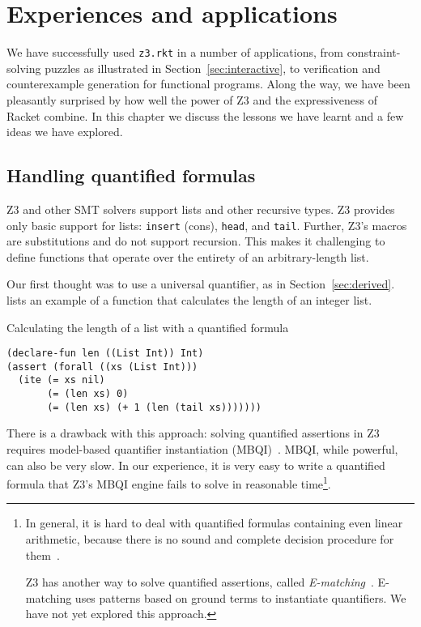 \chapter{Experiences and applications}

We have successfully used \texttt{z3.rkt} in a number of applications, from
constraint-solving puzzles as illustrated in Section~\ref{sec:interactive}, to
verification and counterexample generation for functional programs. Along the
way, we have been pleasantly surprised by how well the power of Z3 and the
expressiveness of Racket combine. In this chapter we discuss the lessons we
have learnt and a few ideas we have explored.

\section{Handling quantified formulas}
\label{sec:quantified}

Z3 and other SMT solvers support lists and other recursive types. Z3 provides
only basic support for lists: \texttt{insert} (cons), \texttt{head}, and
\texttt{tail}. Further, Z3's macros are substitutions and do not support
recursion. This makes it challenging to define functions that operate over the
entirety of an arbitrary-length list.

Our first thought was to use a universal quantifier, as in
Section~\ref{sec:derived}.  lists an example of a
function that calculates the length of an integer list.

\begin{program}
\caption{Calculating the length of a list with a quantified formula}
\label{fig:len-quantified}
\begin{verbatim}
(declare-fun len ((List Int)) Int)
(assert (forall ((xs (List Int)))
  (ite (= xs nil)
       (= (len xs) 0)
       (= (len xs) (+ 1 (len (tail xs)))))))
\end{verbatim}
\end{program}

There is a drawback with this approach: solving quantified assertions in Z3
requires model-based quantifier instantiation (MBQI)~\cite{mbqi}. MBQI, while
powerful, can also be very slow. In our experience, it is very easy to write a
quantified formula that Z3's MBQI engine fails to solve in reasonable
time\footnote{In general, it is hard to deal with quantified formulas
containing even linear arithmetic, because there is no sound and complete
decision procedure for them~\cite{halpern91}.

Z3 has another way to solve quantified assertions, called
\textit{E-matching}~\cite{e-matching}. E-matching uses patterns based on
ground terms to instantiate quantifiers. We have not yet explored this
approach.}.

